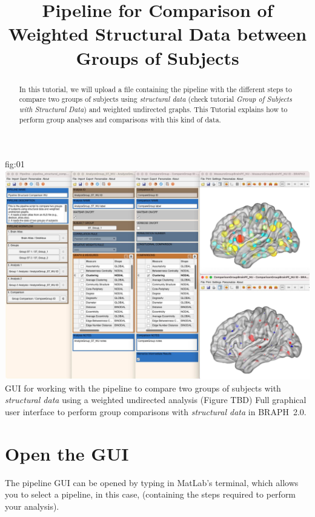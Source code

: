 \documentclass[justified]{tufte-handout}
\title{Pipeline for Comparison of Weighted Structural Data between Groups of Subjects}
\begin{document}
\maketitle

\begin{abstract}
\noindent
In this tutorial, we will upload a file containing the pipeline with the different steps to compare two groups of subjects using \emph{structural data} (check tutorial \emph{Group of Subjects with Structural Data}) and weighted undirected graphs. This Tutorial explains how to perform group analyses and comparisons with this kind of data.
\end{abstract}

\tableofcontents

	{fig:01}
	{\includegraphics{fig01.jpg}}
	{GUI for working with the pipeline to compare two groups of subjects with \emph{structural data} using a weighted undirected analysis (Figure TBD)}
	{
	Full graphical user interface to perform group comparisons with \emph{structural data} in BRAPH~2.0. 
	}

\clearpage
\section{Open the GUI}

The pipeline GUI can be opened by typing  in MatLab's terminal, which allows you to select a pipeline, in this case,  (containing the steps required to perform your analysis).
\end{document}
